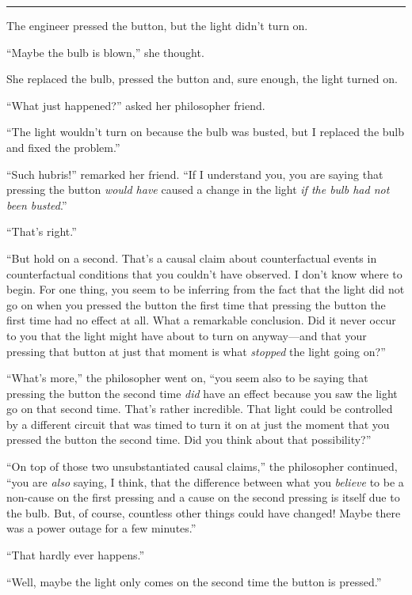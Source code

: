 \documentclass[
  12pt,
]{book}
\begin{document}
\begin{center}\rule{0.5\linewidth}{0.5pt}\end{center}

The engineer pressed the button, but the light didn't turn on.

``Maybe the bulb is blown,'' she thought.

She replaced the bulb, pressed the button and, sure enough, the light turned on.

``What just happened?'' asked her philosopher friend.

``The light wouldn't turn on because the bulb was busted, but I replaced the bulb and fixed the problem.''

``Such hubris!'' remarked her friend. ``If I understand you, you are saying that pressing the button \emph{would have} caused a change in the light \emph{if the bulb had not been busted}.''

``That's right.''

``But hold on a second. That's a causal claim about counterfactual events in counterfactual conditions that you couldn't have observed. I don't know where to begin. For one thing, you seem to be inferring from the fact that the light did not go on when you pressed the button the first time that pressing the button the first time had no effect at all. What a remarkable conclusion. Did it never occur to you that the light might have about to turn on anyway---and that your pressing that button at just that moment is what \emph{stopped} the light going on?''

``What's more,'' the philosopher went on, ``you seem also to be saying that pressing the button the second time \emph{did} have an effect because you saw the light go on that second time. That's rather incredible. That light could be controlled by a different circuit that was timed to turn it on at just the moment that you pressed the button the second time. Did you think about that possibility?''

``On top of those two unsubstantiated causal claims,'' the philosopher continued, ``you are \emph{also} saying, I think, that the difference between what you \emph{believe} to be a non-cause on the first pressing and a cause on the second pressing is itself due to the bulb. But, of course, countless other things could have changed! Maybe there was a power outage for a few minutes.''

``That hardly ever happens.''

``Well, maybe the light only comes on the second time the button is pressed.''
\end{document}
